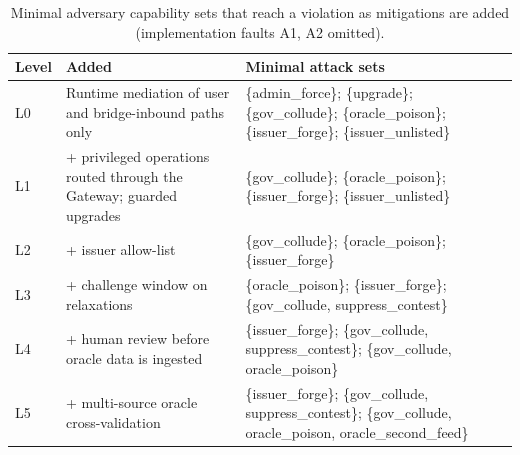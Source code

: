 \begin{table}[t]
\centering\small
\caption{Minimal adversary capability sets that reach a violation as mitigations are added (implementation faults A1, A2 omitted).}
\label{tab:cuts}
\begin{tabular}{lp{4.6cm}p{6.8cm}}
\toprule
Level & Added & Minimal attack sets \\
\midrule
L0 & Runtime mediation of user and bridge-inbound paths only & \{admin\_force\}; \{upgrade\}; \{gov\_collude\}; \{oracle\_poison\}; \{issuer\_forge\}; \{issuer\_unlisted\} \\
L1 & + privileged operations routed through the Gateway; guarded upgrades & \{gov\_collude\}; \{oracle\_poison\}; \{issuer\_forge\}; \{issuer\_unlisted\} \\
L2 & + issuer allow-list & \{gov\_collude\}; \{oracle\_poison\}; \{issuer\_forge\} \\
L3 & + challenge window on relaxations & \{oracle\_poison\}; \{issuer\_forge\}; \{gov\_collude, suppress\_contest\} \\
L4 & + human review before oracle data is ingested & \{issuer\_forge\}; \{gov\_collude, suppress\_contest\}; \{gov\_collude, oracle\_poison\} \\
L5 & + multi-source oracle cross-validation & \{issuer\_forge\}; \{gov\_collude, suppress\_contest\}; \{gov\_collude, oracle\_poison, oracle\_second\_feed\} \\
\bottomrule
\end{tabular}
\end{table}
